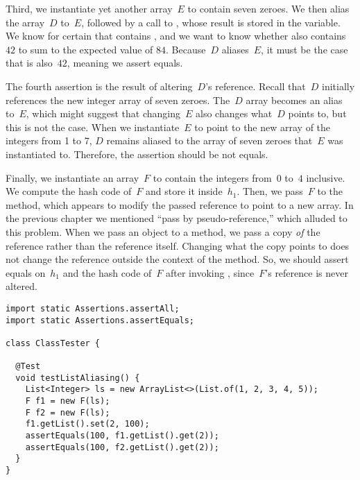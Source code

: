 Third, we instantiate yet another array~$E$ to contain seven zeroes. We then alias the array~$D$ to~$E$, followed by a call to , whose result is stored in the  variable. We know for certain that  contains , and we want to know whether  also contains~$42$ to sum to the expected value of $84$. Because~$D$ aliases~$E$, it must be the case that  is also~$42$, meaning we assert equals.

The fourth assertion is the result of altering~$D$'s reference. Recall that~$D$ initially references the new integer array of seven zeroes. The~$D$ array becomes an alias to~$E$, which might suggest that changing~$E$ also changes what~$D$ points to, but this is not the case. When we instantiate~$E$ to point to the new array of the integers from 1 to 7, $D$ remains aliased to the array of seven zeroes that~$E$ was instantiated to. Therefore, the assertion should be not equals.

Finally, we instantiate an array~$F$ to contain the integers from~$0$ to~$4$ inclusive. We compute the hash code of~$F$ and store it inside~$h_1$. Then, we pass~$F$ to the  method, which appears to modify the passed reference to point to a new array. In the previous chapter we mentioned ``pass by pseudo-reference,'' which alluded to this problem. When we pass an object to a method, we pass a copy \emph{of} the reference rather than the reference itself. Changing what the copy points to does not change the reference outside the context of the  method. So, we should assert equals on~$h_1$ and the hash code of~$F$ after invoking , since~$F$'s reference is never altered.


\enlargethispage{1\baselineskip}
\begin{lstlisting}[language=MyJava]
import static Assertions.assertAll;
import static Assertions.assertEquals;

class ClassTester {

  @Test
  void testListAliasing() {
    List<Integer> ls = new ArrayList<>(List.of(1, 2, 3, 4, 5));
    F f1 = new F(ls);
    F f2 = new F(ls);
    f1.getList().set(2, 100);
    assertEquals(100, f1.getList().get(2));
    assertEquals(100, f2.getList().get(2));
  }
}
\end{lstlisting}


